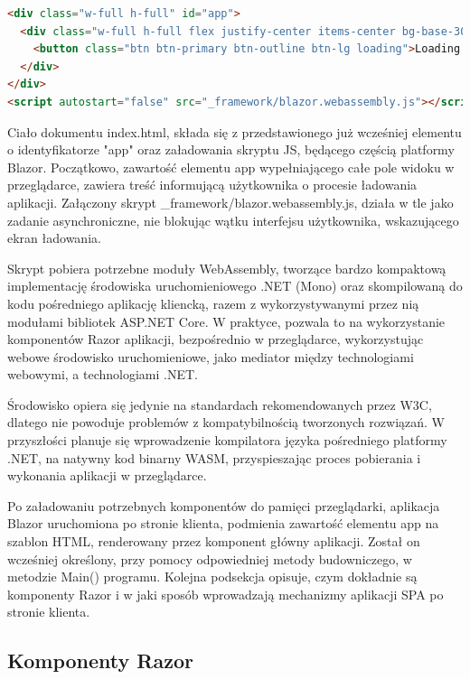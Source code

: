 \begin{lstlisting}[language=HTML, caption={Treść ciała dokumentu index.html w rdzeniu webowym aplikacji klienckiej}, label=lst:index_body]
<div class="w-full h-full" id="app">
  <div class="w-full h-full flex justify-center items-center bg-base-300">
    <button class="btn btn-primary btn-outline btn-lg loading">Loading OpenOSP...</button>
  </div>
</div>
<script autostart="false" src="_framework/blazor.webassembly.js"></script>
\end{lstlisting}

Ciało dokumentu index.html, składa się z przedstawionego już wcześniej elementu o identyfikatorze "app" oraz załadowania skryptu JS, będącego częścią platformy Blazor. Początkowo, zawartość elementu app wypełniającego całe pole widoku w przeglądarce, zawiera treść informującą użytkownika o procesie ładowania aplikacji. Załączony skrypt \_framework/blazor.webassembly.js, działa w tle jako zadanie asynchroniczne, nie blokując wątku interfejsu użytkownika, wskazującego ekran ładowania. 

Skrypt pobiera potrzebne moduły WebAssembly, tworzące bardzo kompaktową implementację środowiska uruchomieniowego .NET (Mono) oraz skompilowaną do kodu pośredniego aplikację kliencką, razem z wykorzystywanymi przez nią modułami bibliotek ASP.NET Core. W praktyce, pozwala to na wykorzystanie komponentów Razor aplikacji, bezpośrednio w przeglądarce, wykorzystując webowe środowisko uruchomieniowe, jako mediator między technologiami webowymi, a technologiami .NET. 

Środowisko opiera się jedynie na standardach rekomendowanych przez W3C, dlatego nie powoduje problemów z kompatybilnością tworzonych rozwiązań. W przyszłości planuje się wprowadzenie kompilatora języka pośredniego platformy .NET, na natywny kod binarny WASM, przyspieszając proces pobierania i wykonania aplikacji w przeglądarce.

Po załadowaniu potrzebnych komponentów do pamięci przeglądarki, aplikacja Blazor uruchomiona po stronie klienta, podmienia zawartość elementu app na szablon HTML, renderowany przez komponent główny aplikacji. Został on wcześniej określony, przy pomocy odpowiedniej metody budowniczego, w metodzie Main() programu. Kolejna podsekcja opisuje, czym dokładnie są komponenty Razor i w jaki sposób wprowadzają mechanizmy aplikacji SPA po stronie klienta.

\subsection{Komponenty Razor}

